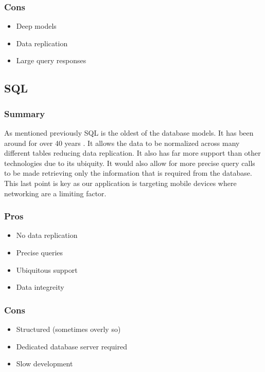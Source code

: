 \documentclass[draftclsnofoot,onecolumn,journal,letterpaper,compsoc,10pt]{IEEEtran}
\begin{document}
        \subsubsection{Cons}
        
        \begin{itemize}
            \item Deep models
            \item Data replication
            \item Large query responses
        \end{itemize}
    
    \subsection{SQL}
    
        \subsubsection{Summary}
        
        As mentioned previously SQL is the oldest of the database models.  It has been around for over 40 years \cite{sqlizer}.  It allows the data to be normalized across many different tables reducing data replication.  It also has far more support than other technologies due to its ubiquity.  It would also allow for more precise query calls to be made retrieving only the information that is required from the database.  This last point is key as our application is targeting mobile devices where networking are a limiting factor.
        
        \subsubsection{Pros}
        \begin{itemize}
            \item No data replication
            \item Precise queries
            \item Ubiquitous support
            \item Data integreity
        \end{itemize}
        
        \subsubsection{Cons}
        \begin{itemize}
            \item Structured (sometimes overly so)
            \item Dedicated database server required
            \item Slow development
        \end{itemize}
    
\end{document}
